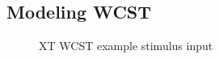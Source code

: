 
\subsection{Modeling WCST} 


\begin{figure}
  \begin{center}
  \end{center}
  \caption{XT WCST example stimulus input}
  \label{xt_wcst_stim}
\end{figure}

